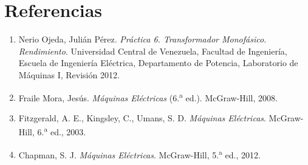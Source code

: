 \documentclass[12pt]{article}
\begin{document}
\section{Referencias}
\begin{enumerate}
    \item Nerio Ojeda, Juli\'an P\'erez. \textit{Pr\'actica 6. Transformador Monof\'asico. Rendimiento}. Universidad Central de Venezuela, Facultad de Ingenier\'ia, Escuela de Ingenier\'ia El\'ectrica, Departamento de Potencia, Laboratorio de M\'aquinas I, Revisi\'on 2012.
    \item Fraile Mora, Jes\'us. \textit{M\'aquinas El\'ectricas} (6.\textsuperscript{a} ed.). McGraw-Hill, 2008.
    \item Fitzgerald, A. E., Kingsley, C., Umans, S. D. \textit{M\'aquinas El\'ectricas}. McGraw-Hill, 6.\textsuperscript{a} ed., 2003.
    \item Chapman, S. J. \textit{M\'aquinas El\'ectricas}. McGraw-Hill, 5.\textsuperscript{a} ed., 2012.
\end{enumerate}
\end{document}
